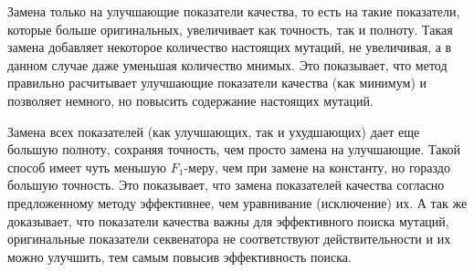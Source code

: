 Замена только на улучшающие показатели качества, то есть на такие показатели, которые больше оригинальных, увеличивает как точность, так и полноту. Такая замена добавляет некоторое количество настоящих мутаций, не увеличивая, а в данном случае даже уменьшая количество мнимых. Это показывает, что метод правильно расчитывает улучшающие показатели качества (как минимум) и позволяет немного, но повысить содержание настоящих мутаций.   

Замена всех показателей (как улучшающих, так и ухудшающих) дает еще большую полноту, сохраняя точность, чем просто замена на улучшающие. Такой способ имеет чуть меньшую $F_1$-меру, чем при замене на константу, но гораздо большую точность. Это показывает, что замена показателей качества согласно предложенному методу эффективнее, чем уравнивание (исключение) их. А так же доказывает, что показатели качества важны для эффективного поиска мутаций, оригинальные показатели секвенатора не соответствуют действительности и их можно улучшить, тем самым повысив эффективность поиска.

\begin{table}[!h]
\begin{center}
\huge
{}
\end{center}
\captionsetup{justification=centering}
\caption{Результаты эксперимента.}
\label{recalib_results}
\end{table} 

